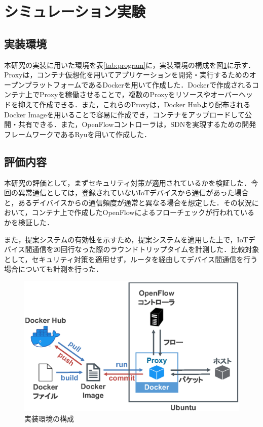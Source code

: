 \documentclass[a4paper,10pt,twocolumn,uplatex]{jsarticle}
\begin{document}
\section{シミュレーション実験}
\subsection{実装環境}
本研究の実装に用いた環境を表\ref{tab:program}に，実装環境の構成を図\ref{fig:program}に示す．Proxyは，コンテナ仮想化を用いてアプリケーションを開発・実行するためのオープンプラットフォームであるDockerを用いて作成した．Dockerで作成されるコンテナ上でProxyを稼働させることで，複数のProxyをリソースやオーバーヘッドを抑えて作成できる．また，これらのProxyは，Docker Hubより配布されるDocker Imageを用いることで容易に作成でき，コンテナをアップロードして公開・共有できる．また，OpenFlowコントローラは，SDNを実現するための開発フレームワークであるRyuを用いて作成した．

\subsection{評価内容}
本研究の評価として，まずセキュリティ対策が適用されているかを検証した．今回の異常通信としては，登録されていないIoTデバイスから通信があった場合と，あるデイバイスからの通信頻度が通常と異なる場合を想定した．その状況において，コンテナ上で作成したOpenFlowによるフローチェックが行われているかを検証した．\par
また，提案システムの有効性を示すため，提案システムを適用した上で，IoTデバイス間通信を20回行なった際のラウンドトリップタイムを計測した．比較対象として，セキュリティ対策を適用せず，ルータを経由してデバイス間通信を行う場合についても計測を行った．

\begin{figure}[!tb]
  \centering
  \includegraphics[width=\linewidth]{img/program.eps}
  \caption{実装環境の構成}
  \label{fig:program}
\end{figure}
\end{document}
